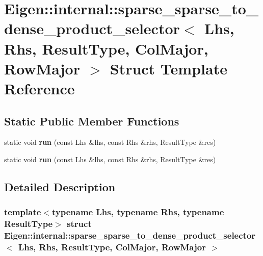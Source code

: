 \hypertarget{struct_eigen_1_1internal_1_1sparse__sparse__to__dense__product__selector_3_01_lhs_00_01_rhs_00_03ba5c23d41a3f74ec97ddc300014b4ee}{}\section{Eigen\+:\+:internal\+:\+:sparse\+\_\+sparse\+\_\+to\+\_\+dense\+\_\+product\+\_\+selector$<$ Lhs, Rhs, Result\+Type, Col\+Major, Row\+Major $>$ Struct Template Reference}
\label{struct_eigen_1_1internal_1_1sparse__sparse__to__dense__product__selector_3_01_lhs_00_01_rhs_00_03ba5c23d41a3f74ec97ddc300014b4ee}
\subsection*{Static Public Member Functions}
\begin{DoxyCompactItemize}
\item 
\mbox{\label{struct_eigen_1_1internal_1_1sparse__sparse__to__dense__product__selector_3_01_lhs_00_01_rhs_00_03ba5c23d41a3f74ec97ddc300014b4ee_af56fba3cdf9cd7eff6c212e0597e43f2}} 
static void {\bfseries run} (const Lhs \&lhs, const Rhs \&rhs, Result\+Type \&res)
\item 
\mbox{\label{struct_eigen_1_1internal_1_1sparse__sparse__to__dense__product__selector_3_01_lhs_00_01_rhs_00_03ba5c23d41a3f74ec97ddc300014b4ee_af56fba3cdf9cd7eff6c212e0597e43f2}} 
static void {\bfseries run} (const Lhs \&lhs, const Rhs \&rhs, Result\+Type \&res)
\end{DoxyCompactItemize}


\subsection{Detailed Description}
\subsubsection*{template$<$typename Lhs, typename Rhs, typename Result\+Type$>$\newline
struct Eigen\+::internal\+::sparse\+\_\+sparse\+\_\+to\+\_\+dense\+\_\+product\+\_\+selector$<$ Lhs, Rhs, Result\+Type, Col\+Major, Row\+Major $>$}



